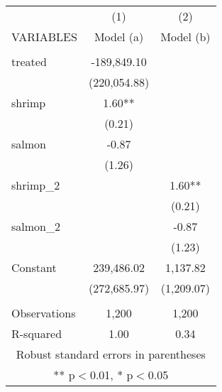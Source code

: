 \begin{tabular}{lcc} \hline
 & (1) & (2) \\
VARIABLES & Model (a) & Model (b) \\ \hline
 &  &  \\
treated & -189,849.10 &  \\
 & (220,054.88) &  \\
shrimp & 1.60** &  \\
 & (0.21) &  \\
salmon & -0.87 &  \\
 & (1.26) &  \\
shrimp\_2 &  & 1.60** \\
 &  & (0.21) \\
salmon\_2 &  & -0.87 \\
 &  & (1.23) \\
Constant & 239,486.02 & 1,137.82 \\
 & (272,685.97) & (1,209.07) \\
 &  &  \\
Observations & 1,200 & 1,200 \\
 R-squared & 1.00 & 0.34 \\ \hline
\multicolumn{3}{c}{ Robust standard errors in parentheses} \\
\multicolumn{3}{c}{ ** p$<$0.01, * p$<$0.05} \\
\end{tabular}
